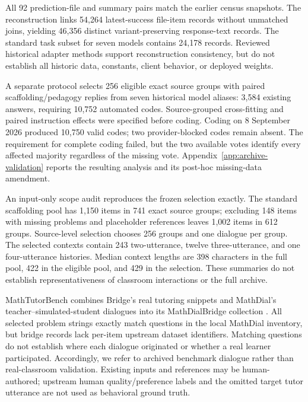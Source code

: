 All 92 prediction-file and summary pairs match the earlier census snapshots.
The reconstruction links 54,264 latest-success file-item records without
unmatched joins, yielding 46,356 distinct variant-preserving response-text
records. The standard task subset for seven models contains 24,178 records.
Reviewed historical adapter methods support reconstruction consistency, but do
not establish all historic data, constants, client behavior, or deployed weights.

A separate protocol selects 256 eligible exact source groups with paired
scaffolding/pedagogy replies from seven historical model aliases: 3,584 existing
answers, requiring 10,752 automated codes. Source-grouped cross-fitting and
paired instruction effects were specified before coding. Coding on 8 September
2026 produced 10,750 valid codes; two provider-blocked codes remain absent.
The requirement for complete coding failed, but the two available votes identify every
affected majority regardless of the missing vote. Appendix~\ref{app:archive-validation}
reports the resulting analysis and its post-hoc missing-data amendment.

An input-only scope audit reproduces the frozen selection exactly. The standard
scaffolding pool has 1,150 items in 741 exact source groups; excluding 148 items
with missing problems and placeholder references leaves 1,002 items in 612
groups. Source-level selection chooses 256 groups and one dialogue per group.
The selected contexts contain 243 two-utterance, twelve three-utterance, and one
four-utterance histories. Median context lengths are 398 characters in the full
pool, 422 in the eligible pool, and 429 in the selection. These summaries do not
establish representativeness of classroom interactions or the full archive.

MathTutorBench combines Bridge's real tutoring snippets
\citep{wang2024bridge} and MathDial's teacher--simulated-student dialogues
\citep{macina2023mathdial} into its MathDialBridge collection
\citep{macina2025mathtutorbench}. All selected problem strings exactly match
questions in the local MathDial inventory, but bridge records lack per-item
upstream dataset identifiers. Matching questions do not establish where each dialogue originated or whether
a real learner participated. Accordingly, we refer to archived
benchmark dialogue rather than real-classroom validation. Existing inputs and
references may be human-authored; upstream human quality/preference labels and
the omitted target tutor utterance are not used as behavioral ground truth.



